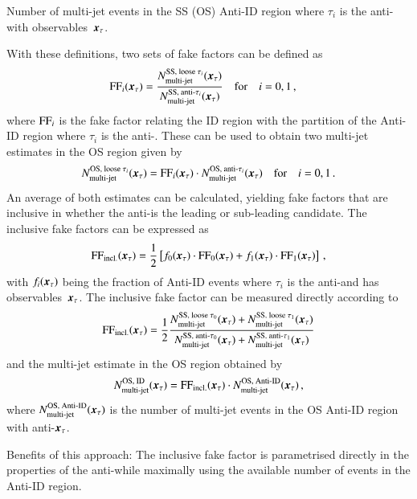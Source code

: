 {\begin{description}[style=standard]
  \item[$\NmjAntiID{SS(OS)}{i}\ffargs$] Number of multi-jet events in
    the SS (OS) Anti-ID region where $\tau_i$ is the anti-\tauhadvis
    with observables~$\myvec{x}_\tau$.
  \end{description}
  With these definitions, two sets of fake factors can be defined as
  \begin{align*}
    \FF_{i}\ffargs &= \frac{\NmjID{SS}{i} \ffargs}{\NmjAntiID{SS}{i}\ffargs}
                     \quad \text{for} \quad i = 0, 1 \,\text{,}
  \end{align*}
  where $\text{FF}_{i}$ is the fake factor relating the ID region with the
  partition of the Anti-ID region where $\tau_i$ is the
  anti-\tauhadvis. These can be used to obtain two multi-jet estimates
  in the OS region given by
  \begin{align*}
    \NmjID{OS}{i}\ffargs = \FF_{i}\ffargs \cdot \NmjAntiID{OS}{i}\ffargs
    \quad \text{for} \quad i = 0, 1 \,\text{.}
  \end{align*}
  An average of both estimates can be calculated, yielding fake
  factors that are inclusive in whether the anti-\tauhadvis is the
  leading or sub-leading \tauhadvis candidate. The inclusive fake
  factors can be expressed as
  \begin{align*}
    \FF_\text{incl.}\ffargs = \frac{1}{2} \left[ f_0\ffargs \cdot \FF_0\ffargs
    + f_1\ffargs \cdot \FF_1\ffargs \right] \,\text{,}
  \end{align*}
  with $f_i\ffargs$ being the fraction of Anti-ID events where
  $\tau_i$ is the anti-\tauhadvis and has
  observables~$\myvec{x}_\tau$. The inclusive fake factor can be
  measured directly according to
  \begin{align*}
    \FF_\text{incl.}\ffargs
    = \frac{1}{2} \frac{ \NmjID{SS}{0}\ffargs + \NmjID{SS}{1}\ffargs }
                       { \NmjAntiID{SS}{0}\ffargs + \NmjAntiID{SS}{1}\ffargs }
  \end{align*}
  and the multi-jet estimate in the OS region obtained by
  \begin{align*}
    \NmjIDIncl{OS}\ffargs = \FF_\text{incl.}\ffargs \cdot \NmjAntiIDIncl{OS}\ffargs \,\text{,}
  \end{align*}
  where $\NmjAntiIDIncl{OS}\ffargs$ is the number of multi-jet events
  in the OS Anti-ID region with anti-\tauhadvis $\myvec{x}_\tau$.

  Benefits of this approach: The inclusive fake factor is parametrised
  directly in the properties of the anti-\tauhadvis while maximally
  using the available number of events in the Anti-ID region.
}


